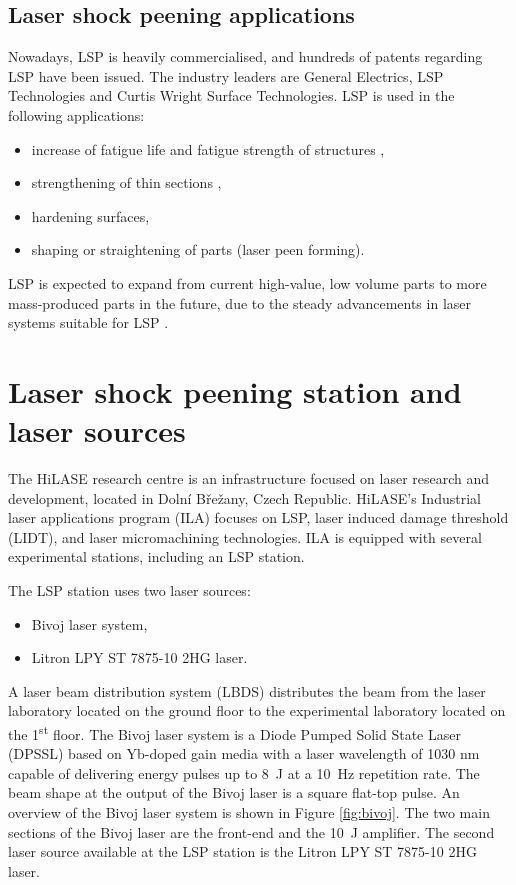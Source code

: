 \subsection{Laser shock peening applications}

Nowadays, LSP is heavily commercialised, and hundreds of patents regarding LSP have been issued. The industry leaders are General Electrics, LSP Technologies and Curtis Wright Surface Technologies. LSP is used in the following applications:

\begin{itemize}
 
    \item increase of fatigue life and fatigue strength of structures \cite{dane_hackel_daly_harrisson_2000},
    \item strengthening of thin sections \cite{vaccari_1992},
    \item hardening surfaces,
    \item shaping or straightening of parts  (laser peen forming).

\end{itemize}
LSP is expected to expand from current high-value, low volume parts to more mass-produced parts in the future, due to the steady advancements in laser systems suitable for LSP \cite{clauer_2019}. 



\section{Laser shock peening station and laser sources}

The HiLASE research centre is an infrastructure focused on laser research and development, located in Dolní Břežany, Czech Republic. HiLASE's Industrial laser applications program (ILA) focuses on LSP, laser induced damage threshold (LIDT), and laser micromachining technologies. ILA is equipped with several experimental stations, including an LSP station. 

The LSP station uses two laser sources:

\begin{itemize}
  \item Bivoj laser system,
  \item Litron LPY ST 7875-10 2HG laser.
\end{itemize}
A laser beam distribution system (LBDS) distributes the beam from the laser laboratory located on the ground floor to the experimental laboratory located on the 1\textsuperscript{st} floor. The Bivoj laser system is a Diode Pumped Solid State Laser (DPSSL) based on Yb-doped gain media with a laser wavelength of 1030 nm capable of delivering energy pulses up to \SI{8}{\joule} at a \SI{10}{\hertz} repetition rate. The beam shape at the output of the Bivoj laser is a square flat-top pulse. An overview of the Bivoj laser system is shown in Figure \ref{fig:bivoj}. The two main sections of the Bivoj laser are the front-end and the \SI{10}{\joule} amplifier. The second laser source available at the LSP station is the Litron LPY ST 7875-10 2HG laser.
 
